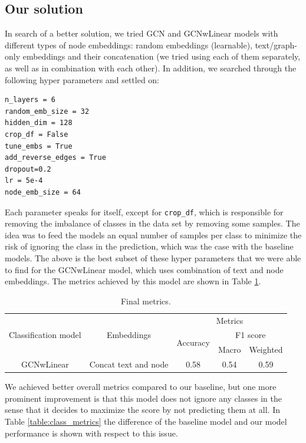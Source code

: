 \documentclass{article}
\newcommand\tab[1][1cm]{\hspace*{#1}}
\begin{document}
\subsection{Our solution}
\tab In search of a better solution, we tried GCN and GCNwLinear models with different types of node embeddings: random embeddings (learnable), text/graph-only embeddings and their concatenation (we tried using each of them separately, as well as in combination with each other). In addition, we searched through the following hyper parameters and settled on:
\begin{verbatim}
n_layers = 6
random_emb_size = 32
hidden_dim = 128
crop_df = False
tune_embs = True
add_reverse_edges = True
dropout=0.2
lr = 5e-4
node_emb_size = 64
\end{verbatim}
Each parameter speaks for itself, except for \texttt{crop_df}, which is responsible for removing the imbalance of classes in the data set by removing some samples. The idea was to feed the models an equal number of samples per class to minimize the risk of ignoring the class in the prediction, which was the case with the baseline models. The above is the best subset of these hyper parameters that we were able to find for the GCNwLinear model, which uses combination of text and node embeddings. The metrics achieved by this model are shown in Table \ref{table:final_metrics}.

\begin{table}[h]
\centering
\begin{tabular}{c c  c c c}
\hline\hline
 & & \multicolumn{3}{c}{Metrics} \\
\cline{3-5}
Classification model & Embeddings & \multirow{2}{*}{Accuracy} & \multicolumn{2}{c}{F1 score} \\
 & & & Macro & Weighted \\
\hline
\multirow{1}{*}{GCNwLinear} & Concat text and node & 0.58 & 0.54 & 0.59 \\
\hline
\end{tabular}
\caption{Final metrics.}
\label{table:final_metrics}
\end{table}

We achieved better overall metrics compared to our baseline, but one more prominent improvement is that this model does not ignore any classes in the sense that it decides to maximize the score by not predicting them at all. In Table \ref{table:class_metrics} the difference of the baseline model and our model performance is shown with respect to this issue.
\end{document}

